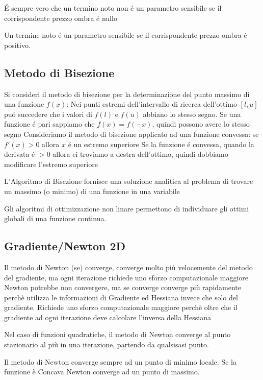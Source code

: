 \documentclass[12pt, a4paper, openany]{book}
\begin{document}
\affermazione
{É sempre vero che un termino noto non é un parametro sensibile se il corrispondente prezzo ombra é nullo}

\affermazione
{Un termine noto é un parametro sensibile se il corrispondente prezzo ombra é positivo.}

\subsection{Metodo di Bisezione}
\affermazionetrue
{
    Si consideri il metodo di bisezione per la determinazione del punto massimo di una funzione $f(x)$: Nei punti estremi dell'intervallo
    di ricerca dell'ottimo $[l,u]$ puó succedere che i valori di $f(l)$ e $f(u)$ abbiano lo stesso segno.
}
{
    Se una funzione é pari sappiamo che $f(x)=f(-x)$, quindi possono avere lo stesso segno
}
\affermazionetrue
{Consideriamo il metodo di bisezione applicato ad una funzione convessa: se $f'(x)>0$ allora $x$ é un estremo superiore}
{Se la funzione é convessa, quando la derivata é $>0$ allora ci troviamo a destra dell'ottimo, quindi dobbiamo modificare l'estremo superiore}

\affermazione
{L'Algoritmo di Bisezione fornisce una soluzione analitica al problema di trovare un massimo (o minimo) di una funzione in una variabile}

\affermazione
{Gli algoritmi di ottimizzazione non linare permettono di individuare gli ottimi globali di una funzione continua.}

\subsection{Gradiente/Newton 2D}

\affermazionetrue
{Il metodo di Newton (se) converge, converge molto più velocemente del metodo del gradiente, ma ogni iterazione richiede uno sforzo computazionale maggiore}
{Newton potrebbe non convergere, ma se converge converge più rapidamente perchè utilizza le informazioni di Gradiente ed Hessiana invece che solo del gradiente.
Richiede uno sforzo computazionale maggiore perchè oltre che il gradiente ad ogni iterazione deve calcolare l'inversa della Hessiana}

\affermazionetrue
{Nel caso di funzioni quadratiche, il metodo di Newton converge al punto stazionario al più in una iterazione, partendo da qualsisasi punto.}

\affermazionefalse
{Il metodo di Newton converge sempre ad un punto di minimo locale.}
{Se la funzione è Concava Newton converge ad un punto di massimo.}
\end{document}
